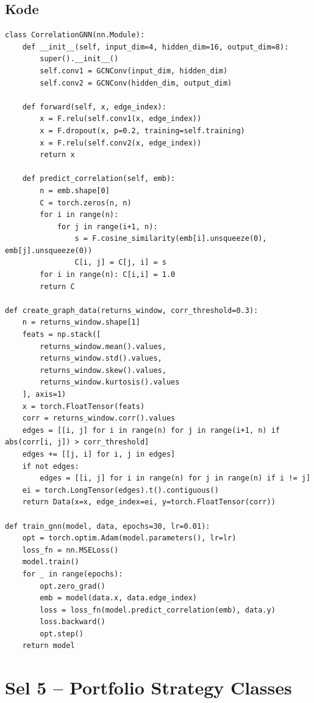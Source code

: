 \documentclass[12pt,a4paper]{article}
\begin{document}
\subsection{Kode}
\begin{lstlisting}[caption={Arsitektur CorrelationGNN dan pelatihan}]
class CorrelationGNN(nn.Module):
    def __init__(self, input_dim=4, hidden_dim=16, output_dim=8):
        super().__init__()
        self.conv1 = GCNConv(input_dim, hidden_dim)
        self.conv2 = GCNConv(hidden_dim, output_dim)

    def forward(self, x, edge_index):
        x = F.relu(self.conv1(x, edge_index))
        x = F.dropout(x, p=0.2, training=self.training)
        x = F.relu(self.conv2(x, edge_index))
        return x

    def predict_correlation(self, emb):
        n = emb.shape[0]
        C = torch.zeros(n, n)
        for i in range(n):
            for j in range(i+1, n):
                s = F.cosine_similarity(emb[i].unsqueeze(0), emb[j].unsqueeze(0))
                C[i, j] = C[j, i] = s
        for i in range(n): C[i,i] = 1.0
        return C

def create_graph_data(returns_window, corr_threshold=0.3):
    n = returns_window.shape[1]
    feats = np.stack([
        returns_window.mean().values,
        returns_window.std().values,
        returns_window.skew().values,
        returns_window.kurtosis().values
    ], axis=1)
    x = torch.FloatTensor(feats)
    corr = returns_window.corr().values
    edges = [[i, j] for i in range(n) for j in range(i+1, n) if abs(corr[i, j]) > corr_threshold]
    edges += [[j, i] for i, j in edges]
    if not edges:
        edges = [[i, j] for i in range(n) for j in range(n) if i != j]
    ei = torch.LongTensor(edges).t().contiguous()
    return Data(x=x, edge_index=ei, y=torch.FloatTensor(corr))

def train_gnn(model, data, epochs=30, lr=0.01):
    opt = torch.optim.Adam(model.parameters(), lr=lr)
    loss_fn = nn.MSELoss()
    model.train()
    for _ in range(epochs):
        opt.zero_grad()
        emb = model(data.x, data.edge_index)
        loss = loss_fn(model.predict_correlation(emb), data.y)
        loss.backward()
        opt.step()
    return model
\end{lstlisting}

\section{Sel 5 -- Portfolio Strategy Classes}
\end{document}
